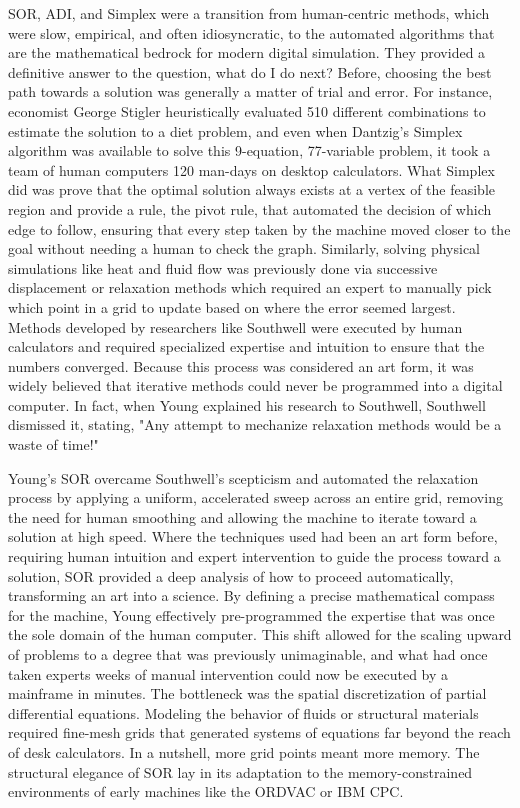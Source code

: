 SOR, ADI, and Simplex were a transition from human-centric methods, which were slow, empirical, and often idiosyncratic, to the automated algorithms that are the mathematical bedrock for modern digital simulation. They provided a definitive answer to the question, what do I do next? Before, choosing the best path towards a solution was generally a matter of trial and error. For instance, economist George Stigler heuristically evaluated 510 different combinations to estimate the solution to a diet problem, and even when Dantzig's Simplex algorithm was available to solve this 9-equation, 77-variable problem, it took a team of human computers 120 man-days on desktop calculators. What Simplex did was prove that the optimal solution always exists at a vertex of the feasible region and provide a rule, the pivot rule, that automated the decision of which edge to follow, ensuring that every step taken by the machine moved closer to the goal without needing a human to check the graph. Similarly, solving physical simulations like heat and fluid flow was previously done via successive displacement or relaxation methods which required an expert to manually pick which point in a grid to update based on where the error seemed largest. Methods developed by researchers like Southwell were executed by human calculators and required specialized expertise and intuition to ensure that the numbers converged. Because this process was considered an art form, it was widely believed that iterative methods could never be programmed into a digital computer. In fact, when Young explained his research to Southwell, Southwell dismissed it, stating, "Any attempt to mechanize relaxation methods would be a waste of time!" \cite{kincaidLifeTimesDr2010}

Young’s SOR overcame Southwell’s scepticism and automated the relaxation process by applying a uniform, accelerated sweep across an entire grid, removing the need for human smoothing and allowing the machine to iterate toward a solution at high speed. Where the techniques used had been an art form before, requiring human intuition and expert intervention to guide the process toward a solution, SOR provided a deep analysis of how to proceed automatically, transforming an art into a science. By defining a precise mathematical compass for the machine, Young effectively pre-programmed the expertise that was once the sole domain of the human computer. This shift allowed for the scaling upward of problems to a degree that was previously unimaginable, and what had once taken experts weeks of manual intervention could now be executed by a mainframe in minutes. The bottleneck was the spatial discretization of partial differential equations. Modeling the behavior of fluids or structural materials required fine-mesh grids that generated systems of equations far beyond the reach of desk calculators. In a nutshell, more grid points meant more memory. The structural elegance of SOR lay in its adaptation to the memory-constrained environments of early machines like the ORDVAC or IBM CPC.

